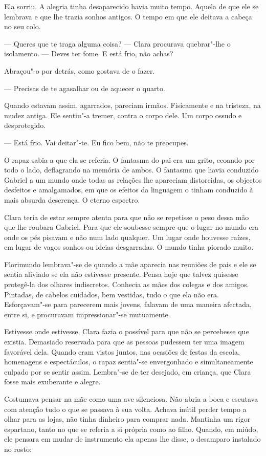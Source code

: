 Ela sorriu. A alegria tinha desaparecido havia muito tempo. Aquela de
que ele se lembrava e que lhe trazia sonhos antigos. O tempo em que ele
deitava a cabeça no seu colo.

--- Queres que te traga alguma coisa? --- Clara procurava quebrar"-lhe o
isolamento. --- Deves ter fome. E está frio, não achas?

Abraçou"-o por detrás, como gostava de o fazer.

---  Precisas de te agasalhar ou de aquecer o quarto.

Quando estavam assim, agarrados, pareciam irmãos. Fisicamente e na
tristeza, na mudez antiga. Ele sentiu"-a tremer, contra o corpo dele. Um
corpo ossudo e desprotegido.

--- Está frio. Vai deitar"-te. Eu fico bem, não te preocupes.

O rapaz sabia a que ela se referia. O fantasma do pai era um grito,
ecoando por todo o lado, deflagrando na memória de ambos. O fantasma que
havia conduzido Gabriel a um mundo onde todas as relações lhe apareciam
distorcidas, os objectos desfeitos e amalgamados, em que os efeitos da
linguagem o tinham conduzido à mais absurda descrença. O eterno
espectro.

Clara teria de estar sempre atenta para que não se repetisse o peso
dessa mão que lhe roubara Gabriel. Para que ele soubesse sempre que o
lugar no mundo era onde os pés pisavam e não num lado qualquer. Um lugar
onde houvesse raízes, em lugar de vagos sonhos ou ideias desgarradas. O
mundo tinha piorado muito.

Florimundo lembrava"-se de quando a mãe aparecia nas reuniões de pais e
ele se sentia aliviado se ela não estivesse presente. Pensa hoje que
talvez quisesse protegê-la dos olhares indiscretos. Conhecia as mães dos
colegas e dos amigos. Pintadas, de cabelos cuidados, bem vestidas, tudo
o que ela não era. Esforçavam"-se para parecerem mais jovens, falavam de
uma maneira afectada, entre si, e procuravam impressionar"-se mutuamente.

Estivesse onde estivesse, Clara fazia o possível para que não se
percebesse que existia. Demasiado reservada para que as pessoas pudessem
ter uma imagem favorável dela. Quando eram vistos juntos, nas ocasiões
de festas da escola, homenagens e espectáculos, o rapaz sentia"-se
envergonhado e simultaneamente culpado por se sentir assim. Lembra"-se de
ter desejado, em criança, que Clara fosse mais exuberante e alegre.

Costumava pensar na mãe como uma ave silenciosa. Não abria a boca e
escutava com atenção tudo o que se passava à sua volta. Achava inútil
perder tempo a olhar para as lojas, não tinha dinheiro para comprar
nada. Mantinha um rigor espartano, tanto no que se referia a si própria
como ao filho. Quando, em miúdo, ele pensara em mudar de instrumento ela
apenas lhe disse, o desamparo instalado no rosto:

